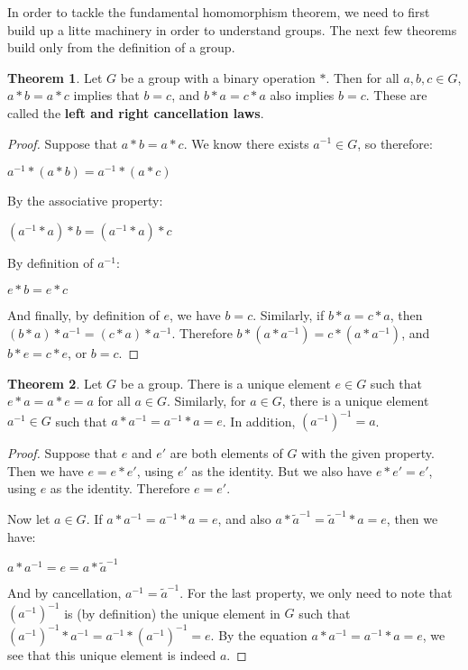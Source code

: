 \documentclass[12pt]{article}
\newcommand{\inv}[1]{#1^{-1}}
\theoremstyle{definition}
\newtheorem{theorem}{Theorem}[section]
\newenvironment{thm}
{\theoremstyle{definition}
\begin{theorem}}
{\end{theorem}}
\begin{document}
In order to tackle the fundamental homomorphism theorem, we need to first build up a litte machinery in order to understand groups. The next few theorems build only from the definition of a group.

\begin{thm}
Let $G$ be a group with a binary operation $*$. Then for all $a, b, c \in G$, $a * b = a * c$ implies that $b = c$, and $b*a = c*a$ also implies $b=c$. These are called the \textbf{left and right cancellation laws}.
\end{thm}

\begin{proof}
Suppose that $a*b = a*c$. We know there exists $\inv{a} \in G$, so therefore:

\begin{center}
    $\inv{a} * (a*b) = \inv{a} * (a*c)$
\end{center}

By the associative property:

\begin{center}
    $(\inv{a} * a) * b = (\inv{a} * a) * c$
\end{center}

By definition of $\inv{a}$:

\begin{center}
    $e * b = e * c$
\end{center}

And finally, by definition of $e$, we have $b = c$. Similarly, if $b*a = c*a$, then $(b*a)*\inv{a} = (c*a)*\inv{a}$. Therefore $b*(a*\inv{a}) = c*(a*\inv{a})$, and $b*e = c*e$, or $b = c$.

\end{proof}

\begin{thm}
Let $G$ be a group. There is a unique element $e \in G$ such that $e*a = a*e = a$ for all $a \in G$. Similarly, for $a \in G$, there is a unique element $\inv{a} \in G$ such that $a*\inv{a} = \inv{a}*a = e$. In addition, $\left(\inv{a}\right)^{-1} = a$.
\end{thm}

\begin{proof}
Suppose that $e$ and $e'$ are both elements of $G$ with the given property. Then we have $e = e*e'$, using $e'$ as the identity. But we also have $e*e' = e'$, using $e$ as the identity. Therefore $e = e'$.

Now let $a \in G$. If $a*\inv{a} = \inv{a}*a = e$, and also $a*\inv{\tilde{a}} = \inv{\tilde{a}}*a = e$, then we have:

\begin{center}
    $a*\inv{a} = e = a*{\inv{\tilde{a}}}$
\end{center}

And by cancellation, $\inv{a} = \inv{\tilde{a}}$. For the last property, we only need to note that $\left(\inv{a}\right)^{-1}$ is (by definition) the unique element in $G$ such that $\left(\inv{a}\right)^{-1} * \inv{a} = \inv{a} * \left(\inv{a}\right)^{-1} = e$. By the equation $a * \inv{a} = \inv{a} * a = e$, we see that this unique element is indeed $a$.

\end{proof}
\end{document}
